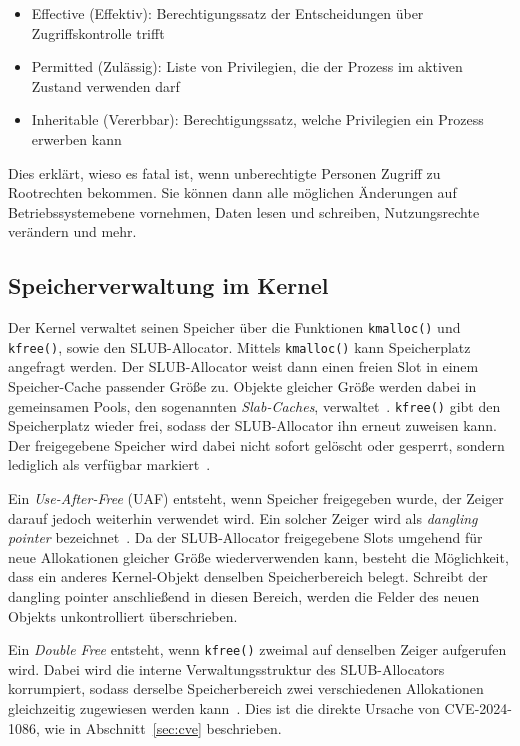 \documentclass[12pt]{article}
\begin{document}
\begin{itemize}
	\item Effective (Effektiv): Berechtigungssatz der Entscheidungen über Zugriffskontrolle trifft
	\item Permitted (Zulässig): Liste von Privilegien, die der Prozess im aktiven Zustand verwenden darf
	\item Inheritable (Vererbbar): Berechtigungssatz, welche Privilegien ein Prozess erwerben kann
\end{itemize}
\cite{PrivAnalyzer}

Dies erklärt, wieso es fatal ist, wenn unberechtigte Personen Zugriff zu Rootrechten bekommen.
Sie können dann alle möglichen Änderungen auf Betriebssystemebene vornehmen, Daten lesen und schreiben, Nutzungsrechte verändern und mehr.

 \subsection{Speicherverwaltung im Kernel}

Der Kernel verwaltet seinen Speicher über die Funktionen \texttt{kmalloc()} 
und \texttt{kfree()}, sowie den SLUB-Allocator. Mittels \texttt{kmalloc()} 
kann Speicherplatz angefragt werden. Der SLUB-Allocator weist dann einen 
freien Slot in einem Speicher-Cache passender Größe zu. Objekte gleicher 
Größe werden dabei in gemeinsamen Pools, den sogenannten \textit{Slab-Caches}, 
verwaltet~\cite{love2010linux}. \texttt{kfree()} gibt den Speicherplatz 
wieder frei, sodass der SLUB-Allocator ihn erneut zuweisen kann. Der 
freigegebene Speicher wird dabei nicht sofort gelöscht oder gesperrt, 
sondern lediglich als verfügbar markiert~\cite{kernel_memory}.

Ein \textit{Use-After-Free} (UAF) entsteht, wenn Speicher freigegeben wurde, 
der Zeiger darauf jedoch weiterhin verwendet wird. Ein solcher Zeiger wird 
als \textit{dangling pointer} bezeichnet~\cite{love2010linux}. Da der 
SLUB-Allocator freigegebene Slots umgehend für neue Allokationen gleicher 
Größe wiederverwenden kann, besteht die Möglichkeit, dass ein anderes 
Kernel-Objekt denselben Speicherbereich belegt. Schreibt der dangling 
pointer anschließend in diesen Bereich, werden die Felder des neuen Objekts 
unkontrolliert überschrieben.

Ein \textit{Double Free} entsteht, wenn \texttt{kfree()} zweimal auf 
denselben Zeiger aufgerufen wird. Dabei wird die interne Verwaltungsstruktur 
des SLUB-Allocators korrumpiert, sodass derselbe Speicherbereich zwei 
verschiedenen Allokationen gleichzeitig zugewiesen werden kann~\cite{love2010linux}. 
Dies ist die direkte Ursache von CVE-2024-1086, wie in 
Abschnitt~\ref{sec:cve} beschrieben.
\end{document}
